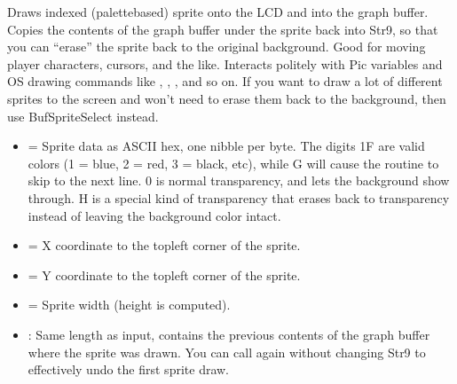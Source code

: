 \documentclass[letterpaper,10pt,english]{sphinxmanual}
\begin{document}
\begin{description}
\sphinxAtStartPar
Draws indexed (palette\sphinxhyphen{}based) sprite onto the LCD and into the graph buffer. Copies the contents of the graph buffer under the sprite back into Str9, so that you can “erase” the sprite back to the original background. Good for moving player characters, cursors, and the like. Interacts politely with Pic variables and OS drawing commands like , , , and so on. If you want to draw a lot of different sprites to the screen and won’t need to erase them back to the background, then use BufSpriteSelect instead.
\begin{description}
\begin{itemize}
\item {} 
\sphinxAtStartPar
{} = Sprite data as ASCII hex, one nibble per byte. The digits 1\sphinxhyphen{}F are valid colors (1 = blue, 2 = red, 3 = black, etc), while G will cause the routine to skip to the next line. 0 is normal transparency, and lets the background show through. H is a special kind of transparency that erases back to transparency instead of leaving the background color intact.

\item {} 
\sphinxAtStartPar
{} = X coordinate to the top\sphinxhyphen{}left corner of the sprite.

\item {} 
\sphinxAtStartPar
{} = Y coordinate to the top\sphinxhyphen{}left corner of the sprite.

\item {} 
\sphinxAtStartPar
{} = Sprite width (height is computed).

\end{itemize}

\begin{itemize}
\item {} 
\sphinxAtStartPar
{}: Same length as input, contains the previous contents of the graph buffer where the sprite was drawn. You can call  again without changing Str9 to effectively undo the first sprite draw.

\end{itemize}


\end{description}
\end{description}
\end{document}
